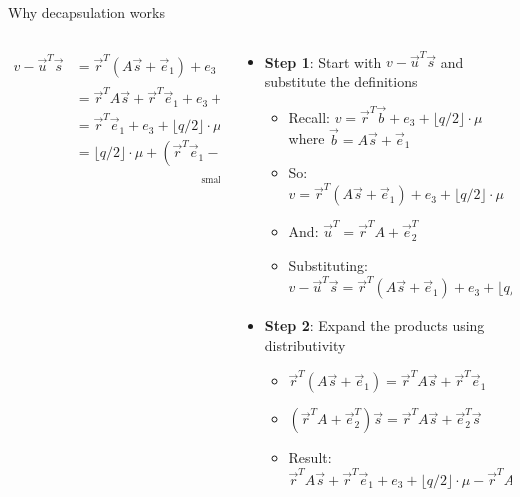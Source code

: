\documentclass[aspectratio=169, lualatex, handout]{beamer}
\begin{document}
\begin{frame}{Why decapsulation works}
	\begin{columns}[c]
		\begin{column}{0.4\textwidth}
			\tiny
			\begin{align*}
				v - \vec{u}^T\vec{s} & = \vec{r}^{T}(A\vec{s} + \vec{e}_1) + e_3 + \lfloor q/2 \rfloor \cdot \mu - (\vec{r}^{T}A + \vec{e}_{2}^{T})\vec{s}               \\
				                     & = \vec{r}^{T}A\vec{s} + \vec{r}^{T}\vec{e}_1 + e_3 + \lfloor q/2 \rfloor \cdot \mu - \vec{r}^{T}A\vec{s} - \vec{e}_{2}^{T}\vec{s} \\
				                     & = \vec{r}^{T}\vec{e}_{1} + e_3 + \lfloor q/2 \rfloor \cdot \mu - \vec{e}_{2}^{T}\vec{s}                                           \\
				                     & = \lfloor q/2 \rfloor \cdot \mu + \underbrace{(\vec{r}^{T}\vec{e}_{1} - \vec{e}_{2}^{T}\vec{s} + e_3)}_{\text{small error}}
			\end{align*}
		\end{column}
		\begin{column}{0.6\textwidth}
			\begin{itemize}
				\item \textbf{Step 1}: Start with $v - \vec{u}^T\vec{s}$ and substitute the definitions
				      \begin{itemize}
					      \item Recall: $v = \vec{r}^T\vec{b} + e_3 + \lfloor q/2 \rfloor \cdot \mu$ where $\vec{b} = A\vec{s} + \vec{e}_1$
					      \item So: $v = \vec{r}^T(A\vec{s} + \vec{e}_1) + e_3 + \lfloor q/2 \rfloor \cdot \mu$
					      \item And: $\vec{u}^T = \vec{r}^TA + \vec{e}_2^T$
					      \item Substituting: $v - \vec{u}^T\vec{s} = \vec{r}^T(A\vec{s} + \vec{e}_1) + e_3 + \lfloor q/2 \rfloor \cdot \mu - (\vec{r}^TA + \vec{e}_2^T)\vec{s}$
				      \end{itemize}
				\item \textbf{Step 2}: Expand the products using distributivity
				      \begin{itemize}
					      \item $\vec{r}^T(A\vec{s} + \vec{e}_1) = \vec{r}^TA\vec{s} + \vec{r}^T\vec{e}_1$
					      \item $(\vec{r}^TA + \vec{e}_2^T)\vec{s} = \vec{r}^TA\vec{s} + \vec{e}_2^T\vec{s}$
					      \item Result: $\vec{r}^TA\vec{s} + \vec{r}^T\vec{e}_1 + e_3 + \lfloor q/2 \rfloor \cdot \mu - \vec{r}^TA\vec{s} - \vec{e}_2^T\vec{s}$
				      \end{itemize}
			\end{itemize}
		\end{column}
	\end{columns}
\end{frame}
\end{document}
